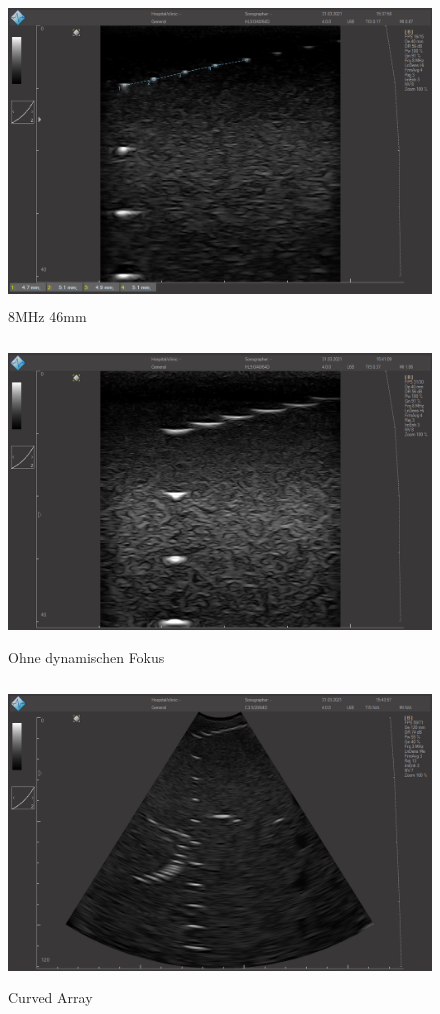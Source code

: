 \documentclass[11pt]{scrartcl}
\begin{document}
    \begin{figure}[H]
        \centering
        \includegraphics[height=8cm]{images/D_8_46_e}
        \caption{8MHz 46mm}
        \label{fig:D_8_46}
    \end{figure}

    \begin{figure}[H]
        \centering
        \includegraphics[height=8cm]{images/D_ohne_dynamisch_fokusiert_e}
        \caption{Ohne dynamischen Fokus}
        \label{fig:o_d_F}
    \end{figure}

    \begin{figure}[H]
        \centering
        \includegraphics[height=8cm]{images/D_3_e}
        \caption{Curved Array}
        \label{fig:curvedArray}
    \end{figure}
\end{document}
